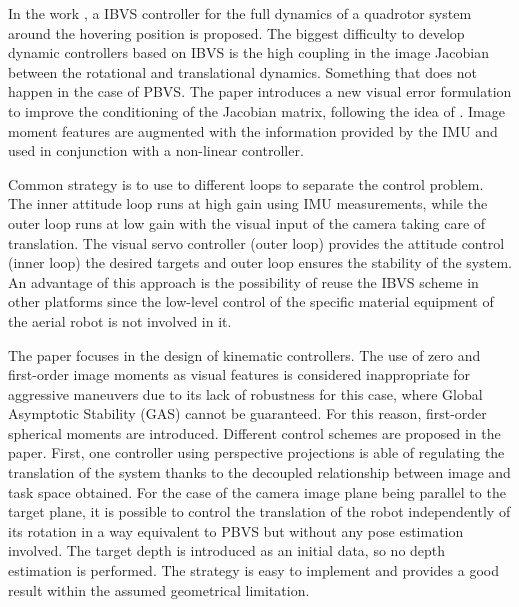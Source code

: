 
In the work \cite{guenard_2008}, a IBVS controller for the full dynamics of a quadrotor system around the hovering position is proposed. The biggest difficulty to develop dynamic controllers based on IBVS is the high coupling in the image Jacobian between the rotational and translational dynamics. Something that does not happen in the case of PBVS. The paper introduces a new visual error formulation to improve the conditioning of the Jacobian matrix, following the idea of \cite{hamel_2002}. Image moment features are augmented with the information provided by the IMU and used in conjunction with a non-linear controller.


Common strategy is to use to different loops to separate the control problem. The inner attitude loop runs at high gain using IMU measurements, while the outer loop runs at low gain with the visual input of the camera taking care of translation. The visual servo controller (outer loop) provides the attitude control (inner loop) the desired targets and outer loop ensures the stability of the system. An advantage of this approach is the possibility of reuse the IBVS scheme in other platforms since the low-level control of the specific material equipment of the aerial robot is not involved in it.

The paper \cite{bourquardez_2009} focuses in the design of kinematic controllers. The use of zero and first-order image moments as visual features is considered inappropriate for aggressive maneuvers due to its lack of robustness for this case, where Global Asymptotic Stability (GAS) cannot be guaranteed. For this reason, first-order spherical moments are introduced. Different control schemes are proposed in the paper. First, one controller using perspective projections is able of regulating the translation of the system thanks to the decoupled relationship between image and task space obtained. For the case of the camera image plane being parallel to the target plane, it is possible to control the translation of the robot independently of its rotation in a way equivalent to PBVS but without any pose estimation involved. The target depth is introduced as an initial data, so no depth estimation is performed. The strategy is easy to implement and provides a good result within the assumed geometrical limitation.


